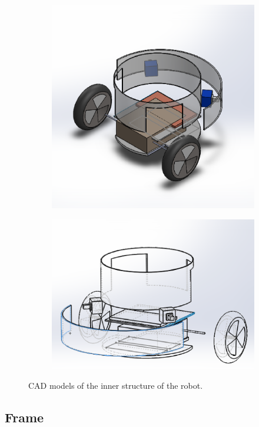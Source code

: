 \documentclass[a4paper,twoside]{book}
\begin{document}
\begin{figure}[b]
 
\begin{subfigure}{0.5\textwidth}
\includegraphics[width=0.9\linewidth]{img/robot} 
\end{subfigure}
\begin{subfigure}{0.5\textwidth}
\includegraphics[width=0.9\linewidth]{img/robot1}
\end{subfigure}
 
\caption{CAD models of the inner structure of the robot.}
\end{figure}

\subsection{Frame}
\end{document}
